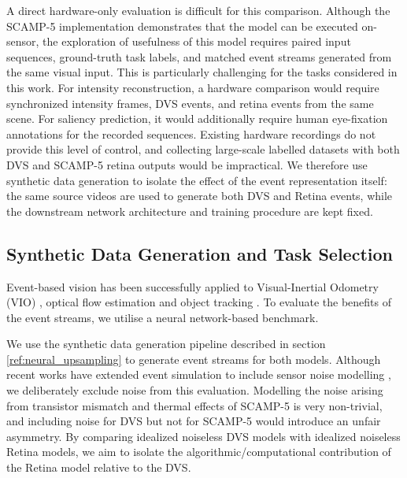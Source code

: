 \documentclass{article}
\begin{document}
A direct hardware-only evaluation is difficult for this comparison. Although the SCAMP-5 implementation demonstrates that the model can be executed on-sensor, the exploration of usefulness of this model requires paired input sequences, ground-truth task labels, and matched event streams generated from the same visual input. This is particularly challenging for the tasks considered in this work. For intensity reconstruction, a hardware comparison would require synchronized intensity frames, DVS events, and retina events from the same scene. For saliency prediction, it would additionally require human eye-fixation annotations for the recorded sequences. Existing hardware recordings do not provide this level of control, and collecting large-scale labelled datasets with both DVS and SCAMP-5 retina outputs would be impractical. We therefore use synthetic data generation to isolate the effect of the event representation itself: the same source videos are used to generate both DVS and Retina events, while the downstream network architecture and training procedure are kept fixed.

\subsection{Synthetic Data Generation and Task Selection}
Event-based vision has been successfully applied to Visual-Inertial Odometry (VIO) \cite{rebecq_high_2019, gallego_event-based_2022}, optical flow estimation \cite{bardow_simultaneous_2016, luo_efficient_2024} and object tracking \cite{shah_codedevents_2024}. To evaluate the benefits of the event streams, we utilise a neural network-based benchmark.

We use the synthetic data generation pipeline described in section \ref{ref:neural_upsampling} to generate event streams for both models. Although recent works have extended event simulation to include sensor noise modelling \cite{hu_v2e_nodate}, we deliberately exclude noise from this evaluation. Modelling the noise arising from transistor mismatch and thermal effects of SCAMP-5 is very non-trivial, and including noise for DVS but not for SCAMP-5 would introduce an unfair asymmetry. By comparing idealized noiseless DVS models with idealized noiseless Retina models, we aim to isolate the algorithmic/computational contribution of the Retina model relative to the DVS.
\end{document}
